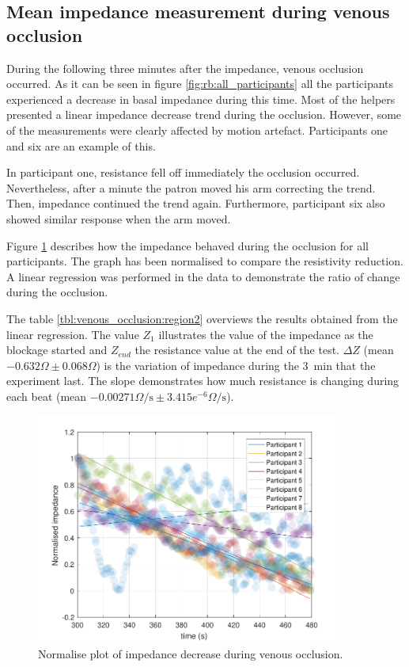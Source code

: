 \subsection{Mean impedance measurement during venous occlusion}
\label{section5.2.2}
During the following three minutes after the impedance, venous occlusion occurred. As it can be seen in figure \ref{fig:rb:all_participants} all the participants experienced a decrease in basal impedance during this time. Most of the helpers presented a linear impedance decrease trend during the occlusion. However, some of the measurements were clearly affected by motion artefact. Participants one and six are an example of this. 

In participant one, resistance fell off immediately the occlusion occurred. Nevertheless, after a minute the patron moved his arm correcting the trend. Then, impedance continued the trend again. Furthermore,  participant six also showed similar response when the arm moved. 

Figure \ref{fig:normalise:venous_occlusion} describes how the impedance behaved during the occlusion for all participants. The graph has been normalised to compare the resistivity reduction.  A linear regression was performed in the data to demonstrate the ratio of change during the occlusion.  

The table \ref{tbl:venous_occlusion:region2} overviews the results obtained from the linear regression. The value $Z_1$ illustrates the value of the impedance as the blockage started and $Z_{end}$ the resistance value at the end of the test.  $\Delta Z$ (mean $-0.632 \Omega \pm0.068\Omega$) is the variation of impedance during the \SI{3}{\minute} that the experiment last.  The slope demonstrates how much resistance is changing during each beat  (mean $-0.00271\Omega\textrm{/s}\pm3.415e^{-6}\Omega\textrm{/s}$). 

\begin{figure}
	\centering
	\includegraphics[width=0.9\textwidth,height=0.9\textheight,keepaspectratio]{figure3}    
	\caption{Normalise plot of impedance decrease during venous occlusion.}
	\label{fig:normalise:venous_occlusion}
\end{figure}

